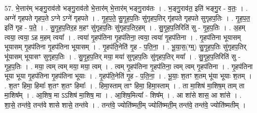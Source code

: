 \documentclass[17pt]{extarticle}
\begin{document}
57. भे॒त्तार॑म् भङ्गु॒राव॑तो भङ्गु॒राव॑तो भे॒त्तार॑म् भे॒त्तार॑म् भङ्गु॒राव॑तः । . भ॒ङ्गु॒राव॑त॒ इति॑ भङ्गु॒र - व॒तः॒ । . अग्ने॑ गृहपते गृहप॒ते ऽग्ने ऽग्ने॑ गृहपते । . गृ॒ह॒प॒ते॒ सु॒गृ॒ह॒प॒तिः सु॑गृहप॒तिर् गृ॑हपते गृहपते सुगृहप॒तिः । . गृ॒ह॒प॒त॒ इति॑ गृह - प॒ते॒ । . सु॒गृ॒ह॒प॒तिर॒ह म॒हꣳ सु॑गृहप॒तिः सु॑गृहप॒तिर॒हम् । . सु॒गृ॒ह॒प॒तिरिति॑ सु - गृ॒ह॒प॒तिः । . अ॒हम् त्वया॒ त्वया॒ ऽह म॒हम् त्वया᳚ । . त्वया॑ गृ॒हप॑तिना गृ॒हप॑तिना॒ त्वया॒ त्वया॑ गृ॒हप॑तिना । . गृ॒हप॑तिना भूयासम् भूयासम् गृ॒हप॑तिना गृ॒हप॑तिना भूयासम् । . गृ॒हप॑ति॒नेति॑ गृ॒ह - प॒ति॒ना॒ । . भू॒या॒स॒(ग्म्॒) सु॒गृ॒ह॒प॒तिः सु॑गृहप॒तिर् भू॑यासम् भूयासꣳ सुगृहप॒तिः । . सु॒गृ॒ह॒प॒तिर् मया॒ मया॑ सुगृहप॒तिः सु॑गृहप॒तिर् मया᳚ । . सु॒गृ॒ह॒प॒तिरिति॑ सु - गृ॒ह॒प॒तिः । . मया॒ त्वम् त्वम् मया॒ मया॒ त्वम् । . त्वम् गृ॒हप॑तिना गृ॒हप॑तिना॒ त्वम् त्वम् गृ॒हप॑तिना । . गृ॒हप॑तिना भूया भूया गृ॒हप॑तिना गृ॒हप॑तिना भूयाः । . गृ॒हप॑ति॒नेति॑ गृ॒ह - प॒ति॒ना॒ । . भू॒याः॒ श॒तꣳ श॒तम् भू॑या भूयाः श॒तम् । . श॒तꣳ हिमा॒ हिमाः᳚ श॒तꣳ श॒तꣳ हिमाः᳚ । . हिमा॒स्ताम् ताꣳ हिमा॒ हिमा॒स्ताम् । . ता मा॒शिष॑ मा॒शिष॒म् ताम् ता मा॒शिष᳚म् । . आ॒शिष॒ मा ऽऽशिष॑ मा॒शिष॒ मा । . आ॒शिष॒मित्या᳚ - शिष᳚म् । . आ शा॑से शास॒ आ शा॑से । . शा॒से॒ तन्त॑वे॒ तन्त॑वे शासे शासे॒ तन्त॑वे । . तन्त॑वे॒ ज्योति॑ष्मती॒म् ज्योति॑ष्मती॒म् तन्त॑वे॒ तन्त॑वे॒ ज्योति॑ष्मतीम् । \newline
\end{document}
